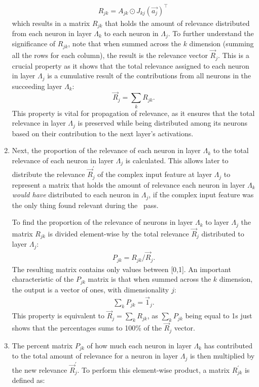 \begin{enumerate}
\begin{eqnarray*}
R_{jk} = A_{jk} \odot J_{kj}(\vec{a_j})^\intercal\, 
\end{eqnarray*}
which results in a matrix $R_{jk}$ that holds the amount of relevance distributed from each neuron in layer $\Lambda_k$ to each neuron in $\Lambda_j$. To further understand the significance of $R_{jk}$, note that when summed across the $k$ dimension (\ie summing all the rows for each column), the result is the relevance vector $\vec{R}_j$. This is a crucial property as it shows that the total relevance assigned to each neuron in layer $\Lambda_j$ is a cumulative result of the contributions from all neurons in the succeeding layer $\Lambda_k$:
\begin{equation*}
    \vec{R}_j = \sum_{k} R_{jk}.
\end{equation*}
This property is vital for propagation of relevance, as it ensures that the total relevance in layer $\Lambda_j$ is preserved while being distributed among its neurons based on their contribution to the next layer's activations.

\item Next, the proportion of the relevance of each neuron in layer $\Lambda_k$ to the total relevance of each neuron in layer $\Lambda_j$ is calculated. This allows later to distribute the relevance $\vec{R}_j^\prime$ of the complex input feature at layer $\Lambda_j$ to represent a matrix that holds the amount of relevance each neuron in layer $\Lambda_k$ \emph{would have} distributed to each neuron in $\Lambda_j$, if the complex input feature was the only thing found relevant during the \LRP\ pass.

To find the proportion of the relevance of neurons in layer $\Lambda_k$ to layer $\Lambda_j$ the matrix $R_{jk}$ is divided element-wise by the total relevance $\vec{R}_{j}$ distributed to layer $\Lambda_j$:
\begin{eqnarray*}
P_{jk} = R_{jk} / \vec{R}_{j}.
\end{eqnarray*}
The resulting matrix contains only values between [0,1]. An important characteristic of the $P_{jk}$ matrix is that when summed across the $k$ dimension, the output is a vector of ones, with dimensionality $j$:
\begin{eqnarray*}
\sum_{k} P_{jk} = \vec{1}_j.
\end{eqnarray*}
This property is equivalent to $\vec{R}_j = \sum_{k} R_{jk}$, as $\sum_{k} P_{jk}$ being equal to 1s just shows that the percentages sums to 100\% of the $\vec{R}_j$ vector. 

\item The percent matrix $P_{jk}$ of how much each neuron in layer $\Lambda_k$ has contributed to the total amount of relevance for a neuron in layer $\Lambda_j$ is then multiplied by the new relevance $\vec{R}_j^\prime$. To perform this element-wise product, a matrix $R_{jk}^\prime$ is defined as:


\end{enumerate}

